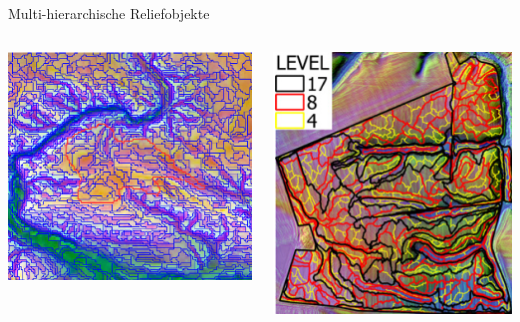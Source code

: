 
\begin{frame}{Multi-hierarchische Reliefobjekte}
\begin{columns}
 \column{6cm}
 \begin{block}{}
 \centering\includegraphics[width=1\textwidth]{FIGURE/Figure_Segmentation1.png}
\end{block}
 \column{5cm}
 \begin{block}{}
 \centering\includegraphics[width=1\textwidth]{FIGURE/Figure_Segmentation2.png}

\end{block}
\end{columns}
\end{frame}
